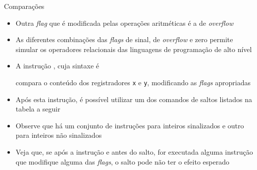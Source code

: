 \begin{frame}[fragile]{Comparações}

    \begin{itemize}
        \item Outra \textit{flag} que é modificada pelas operações aritméticas é a de 
            \textit{overflow}

        \item As diferentes combinações das \textit{flags} de sinal, de \textit{overflow} e zero
            permite simular os operadores relacionais das linguagens de programação de 
            alto nível

        \item A instrução , cuja sintaxe é


        compara o conteúdo dos registradores \texttt{x} e \texttt{y}, modificando as \textit{flags}
        apropriadas

        \item Após esta instrução, é possível utilizar um dos comandos de saltos listados na
            tabela a seguir

        \item Observe que há um conjunto de instruções para inteiros sinalizados e outro para
            inteiros não sinalizados

        \item Veja que, se após a instrução  e antes do salto, for executada
            alguma instrução que modifique alguma das \textit{flags}, o salto pode não ter o
            efeito esperado

    \end{itemize}

\end{frame}

